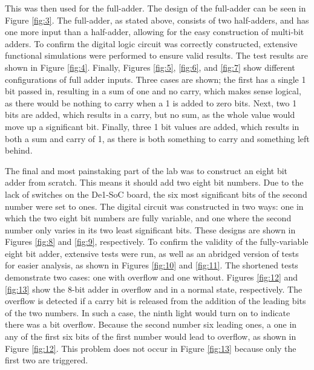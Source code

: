 \documentclass[
	letterpaper, %
	10pt, %
]{CSUniSchoolLabReport}
\begin{document}
  \hspace{.5 in} This was then used for the full-adder. The design of the full-adder can be seen in Figure \ref{fig:3}. The full-adder, as stated above, consists of two half-adders, and has one more input than a half-adder, allowing for the easy construction of multi-bit adders. To confirm the digital logic circuit was correctly constructed, extensive functional simulations were performed to ensure valid results. The test results are shown in Figure \ref{fig:4}. Finally, Figures \ref{fig:5}, \ref{fig:6}, and \ref{fig:7} show different configurations of full adder inputs. Three cases are shown; the first has a single 1 bit passed in, resulting in a sum of one and no carry, which makes sense logical, as there would be nothing to carry when a 1 is added to zero bits. Next, two 1 bits are added, which results in a carry, but no sum, as the whole value would move up a significant bit. Finally, three 1 bit values are added, which results in both a sum and carry of 1, as there is both something to carry and something left behind. \newline

  \hspace{.5 in} The final and most painstaking part of the lab was to construct an eight bit adder from scratch. This means it should add two eight bit numbers. Due to the lack of switches on the De1-SoC board, the six most significant bits of the second number were set to ones. The digital circuit was constructed in two ways: one in which the two eight bit numbers are fully variable, and one where the second number only varies in its two least significant bits. These designs are shown in Figures \ref{fig:8} and \ref{fig:9}, respectively. To confirm the validity of the fully-variable eight bit adder, extensive tests were run, as well as an abridged version of tests for easier analysis, as shown in Figures \ref{fig:10} and \ref{fig:11}. The shortened tests demonstrate two cases: one with overflow and one without. Figures \ref{fig:12} and \ref{fig:13} show the 8-bit adder in overflow and in a normal state, respectively. The overflow is detected if a carry bit is released from the addition of the leading bits of the two numbers. In such a case, the ninth light would turn on to indicate there was a bit overflow. Because the second number six leading ones, a one in any of the first six bits of the first number would lead to overflow, as shown in Figure \ref{fig:12}. This problem does not occur in Figure \ref{fig:13} because only the first two are triggered. \newline
\end{document}
